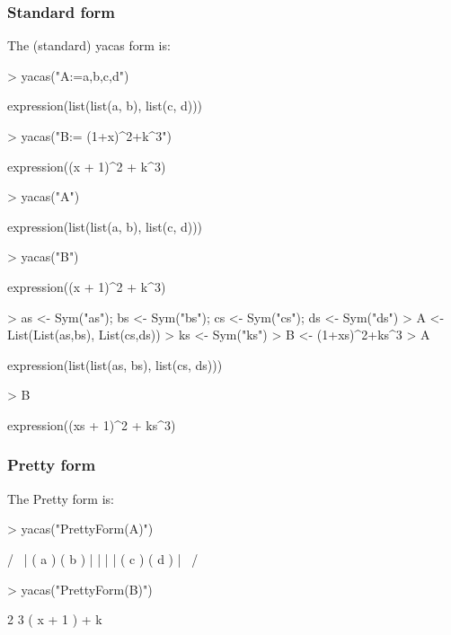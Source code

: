 \documentclass[]{article}
\begin{document}
\subsubsection{Standard form}
The (standard)
yacas form is:
\begin{Schunk}
\begin{Sinput}
> yacas("A:={{a,b},{c,d}}")
\end{Sinput}
\begin{Soutput}
expression(list(list(a, b), list(c, d)))
\end{Soutput}
\begin{Sinput}
> yacas("B:= (1+x)^2+k^3")
\end{Sinput}
\begin{Soutput}
expression((x + 1)^2 + k^3)
\end{Soutput}
\begin{Sinput}
> yacas("A")
\end{Sinput}
\begin{Soutput}
expression(list(list(a, b), list(c, d)))
\end{Soutput}
\begin{Sinput}
> yacas("B")
\end{Sinput}
\begin{Soutput}
expression((x + 1)^2 + k^3)
\end{Soutput}
\end{Schunk}

\begin{Schunk}
\begin{Sinput}
> as <- Sym("as"); bs <- Sym("bs"); cs <- Sym("cs"); ds <- Sym("ds")
> A <- List(List(as,bs), List(cs,ds))
> ks <- Sym("ks")
> B <- (1+xs)^2+ks^3
> A
\end{Sinput}
\begin{Soutput}
expression(list(list(as, bs), list(cs, ds)))
\end{Soutput}
\begin{Sinput}
> B
\end{Sinput}
\begin{Soutput}
expression((xs + 1)^2 + ks^3)
\end{Soutput}
\end{Schunk}


\subsubsection{Pretty form}
The Pretty form is:
\begin{Schunk}
\begin{Sinput}
> yacas("PrettyForm(A)")
\end{Sinput}
\begin{Soutput}
/              \
| ( a ) ( b )  |
|              |
| ( c ) ( d )  |
\              /
\end{Soutput}
\begin{Sinput}
> yacas("PrettyForm(B)")
\end{Sinput}
\begin{Soutput}
         2    3
( x + 1 )  + k 
\end{Soutput}
\end{Schunk}
\end{document}
